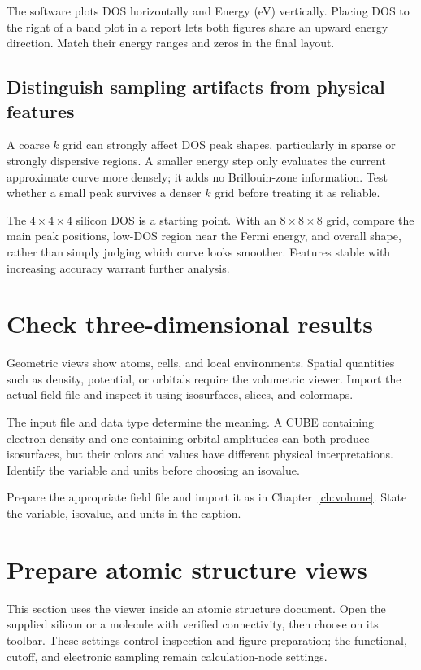 The software plots DOS horizontally and Energy (eV) vertically. Placing DOS to the right of a band plot in a report lets both figures share an upward energy direction. Match their energy ranges and zeros in the final layout.

\subsection{Distinguish sampling artifacts from physical features}

A coarse $k$ grid can strongly affect DOS peak shapes, particularly in sparse or strongly dispersive regions. A smaller energy step only evaluates the current approximate curve more densely; it adds no Brillouin-zone information. Test whether a small peak survives a denser $k$ grid before treating it as reliable.

The $4\times4\times4$ silicon DOS is a starting point. With an $8\times8\times8$ grid, compare the main peak positions, low-DOS region near the Fermi energy, and overall shape, rather than simply judging which curve looks smoother. Features stable with increasing accuracy warrant further analysis.

\section{Check three-dimensional results}

Geometric views show atoms, cells, and local environments. Spatial quantities such as density, potential, or orbitals require the volumetric viewer. Import the actual field file and inspect it using isosurfaces, slices, and colormaps.

The input file and data type determine the meaning. A CUBE containing electron density and one containing orbital amplitudes can both produce isosurfaces, but their colors and values have different physical interpretations. Identify the variable and units before choosing an isovalue.

Prepare the appropriate field file and import it as in Chapter~\ref{ch:volume}. State the variable, isovalue, and units in the caption.

\section{Prepare atomic structure views}

This section uses the viewer inside an atomic structure document. Open the supplied silicon or a molecule with verified connectivity, then choose  on its toolbar. These settings control inspection and figure preparation; the functional, cutoff, and electronic sampling remain calculation-node settings.

